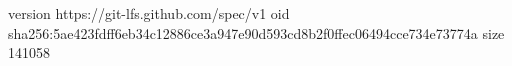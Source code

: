 version https://git-lfs.github.com/spec/v1
oid sha256:5ae423fdff6eb34c12886ce3a947e90d593cd8b2f0ffec06494cce734e73774a
size 141058
